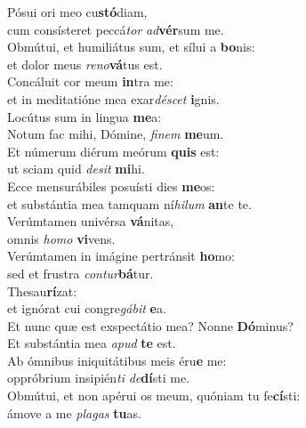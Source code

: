 \evenverse Pósui ori meo cu\textbf{stó}diam,~\*\\
\evenverse cum consísteret peccá\textit{tor} \textit{ad}\textbf{vér}sum me.\\
\oddverse Obmútui, et humiliátus sum, et sílui a \textbf{bo}nis:~\*\\
\oddverse et dolor meus \textit{re}\textit{no}\textbf{vá}tus est.\\
\evenverse Concáluit cor meum \textbf{in}tra me:~\*\\
\evenverse et in meditatióne mea exar\textit{dé}\textit{scet} \textbf{i}gnis.\\
\oddverse Locútus sum in lingua \textbf{me}a:~\*\\
\oddverse Notum fac mihi, Dómine, \textit{fi}\textit{nem} \textbf{me}um.\\
\evenverse Et númerum diérum meórum \textbf{quis} est:~\*\\
\evenverse ut sciam quid \textit{de}\textit{sit} \textbf{mi}hi.\\
\oddverse Ecce mensurábiles posuísti dies \textbf{me}os:~\*\\
\oddverse et substántia mea tamquam ní\textit{hi}\textit{lum} \textbf{an}te te.\\
\evenverse Verúmtamen univérsa \textbf{vá}nitas,~\*\\
\evenverse omnis \textit{ho}\textit{mo} \textbf{vi}vens.\\
\oddverse Verúmtamen in imágine pertránsit \textbf{ho}mo:~\*\\
\oddverse sed et frustra \textit{con}\textit{tur}\textbf{bá}tur.\\
\evenverse Thesau\textbf{rí}zat:~\*\\
\evenverse et ignórat cui congre\textit{gá}\textit{bit} \textbf{e}a.\\
\oddverse Et nunc quæ est exspectátio mea? Nonne \textbf{Dó}minus?~\*\\
\oddverse Et substántia mea \textit{a}\textit{pud} \textbf{te} est.\\
\evenverse Ab ómnibus iniquitátibus meis éru\textbf{e} me:~\*\\
\evenverse oppróbrium insipién\textit{ti} \textit{de}\textbf{dí}sti me.\\
\oddverse Obmútui, et non apérui os meum, quóniam tu fe\textbf{cí}sti:~\*\\
\oddverse ámove a me \textit{pla}\textit{gas} \textbf{tu}as.\\
